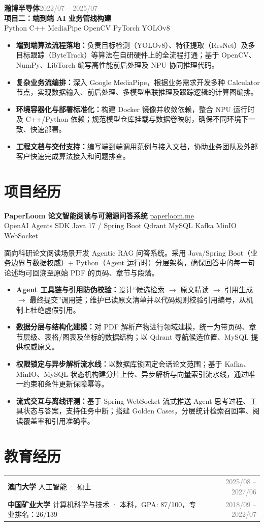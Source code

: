 \documentclass[9pt,a4paper]{ctexart}
\newcommand{\period}[1]{\hfill\textcolor{gray}{\small #1}}
\newcommand{\tags}[1]{\textcolor{black!75}{\footnotesize #1}}
\newcommand{\labelitem}[2]{\item \textbf{#1：}#2}
\begin{document}
\newpage
\textbf{瀚博半导体}\period{2022/07 -- 2025/07}\\[-1pt]
\textbf{项目二：端到端 AI 业务管线构建}\\[-1pt]
\tags{Python \quad C++ \quad MediaPipe \quad OpenCV \quad PyTorch \quad YOLOv8}
\begin{itemize}
  \labelitem{端到端算法流程落地}{负责目标检测（YOLOv8）、特征提取（ResNet）及多目标跟踪（ByteTrack）等算法在自研硬件上的全流程打通；基于 OpenCV、NumPy、LibTorch 编写高性能前后处理及 NPU 协同推理代码。}
  \labelitem{复杂业务流编排}{深入 Google MediaPipe，根据业务需求开发多种 Calculator 节点，实现数据输入、前后处理、多模型串联推理及跟踪逻辑的计算图编排。}
  \labelitem{环境容器化与部署标准化}{构建 Docker 镜像并收敛依赖，整合 NPU 运行时及 C++/Python 依赖；规范模型仓库挂载与数据卷映射，确保不同环境下一致、快速部署。}
  \labelitem{工程文档与交付支持}{编写端到端调用范例与接入文档，协助业务团队及外部客户快速完成算法接入和问题排查。}
\end{itemize}

\section*{项目经历}

\textbf{PaperLoom 论文智能阅读与可溯源问答系统}
\quad\href{https://paperloom.me/}{paperloom.me}\\[-1pt]
\tags{OpenAI Agents SDK \quad Java 17 / Spring Boot \quad Qdrant \quad MySQL \quad Kafka \quad MinIO \quad WebSocket}

面向科研论文阅读场景开发 Agentic RAG 问答系统。采用 Java/Spring Boot（业务边界与数据权威）+ Python（Agent 运行时）分层架构，确保回答中的每一句论述均可回溯至原始 PDF 的页码、章节与段落。
\begin{itemize}
  \labelitem{Agent 工具链与引用防伪校验}{设计“候选检索 \(\rightarrow\) 原文精读 \(\rightarrow\) 引用生成 \(\rightarrow\) 最终提交”调用链；维护已读原文清单并以代码规则校验引用编号，从机制上杜绝虚假引用。}
  \labelitem{数据分层与结构化建模}{对 PDF 解析产物进行领域建模，统一为带页码、章节层级、表格/图表及坐标的数据结构；以 Qdrant 导航候选位置、MySQL 提供权威原文。}
  \labelitem{权限锁定与异步解析流水线}{以数据库锁固定会话论文范围；基于 Kafka、MinIO、MySQL 状态机构建分片上传、异步解析与向量索引流水线，通过唯一约束和条件更新保障幂等。}
  \labelitem{流式交互与离线评测}{基于 Spring WebSocket 流式推送 Agent 思考过程、工具状态与答案，支持任务中断；搭建 Golden Cases，分层统计检索召回率、阅读覆盖率和引用准确率。}
\end{itemize}

\section*{教育经历}

{\small
\begin{tabularx}{\textwidth}{@{}Xr@{}}
  \textbf{澳门大学} \quad 人工智能 · 硕士 & \textcolor{gray}{2025/08 -- 2027/06}\\[2pt]
  \textbf{中国矿业大学} \quad 计算机科学与技术 · 本科，GPA: 87/100，专业排名：26/139 & \textcolor{gray}{2018/09 -- 2022/07}
\end{tabularx}
}
\end{document}
